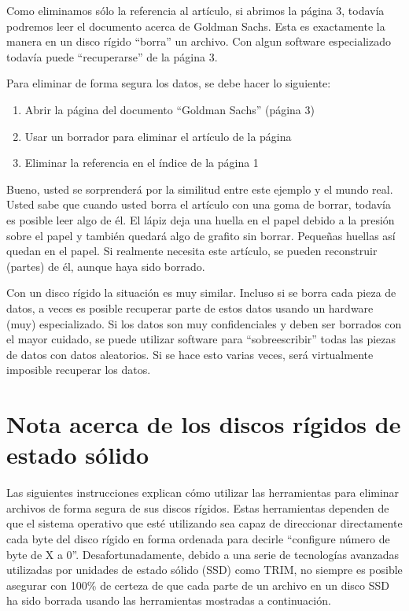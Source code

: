 \documentclass[10pt,a5paper,twoside,,]{book}
\providecommand{\tightlist}{%
  \setlength{\itemsep}{0pt}\setlength{\parskip}{0pt}}
\begin{document}
Como eliminamos sólo la referencia al artículo, si abrimos la página 3,
todavía podremos leer el documento acerca de Goldman Sachs. Esta es
exactamente la manera en un disco rígido ``borra'' un archivo. Con algun
software especializado todavía puede ``recuperarse'' de la página 3.

Para eliminar de forma segura los datos, se debe hacer lo siguiente:

\begin{enumerate}
\def\labelenumi{\arabic{enumi}.}
\tightlist
\item
  Abrir la página del documento ``Goldman Sachs'' (página 3)
\item
  Usar un borrador para eliminar el artículo de la página
\item
  Eliminar la referencia en el índice de la página 1
\end{enumerate}

Bueno, usted se sorprenderá por la similitud entre este ejemplo y el
mundo real. Usted sabe que cuando usted borra el artículo con una goma
de borrar, todavía es posible leer algo de él. El lápiz deja una huella
en el papel debido a la presión sobre el papel y también quedará algo de
grafito sin borrar. Pequeñas huellas así quedan en el papel. Si
realmente necesita este artículo, se pueden reconstruir (partes) de él,
aunque haya sido borrado.

Con un disco rígido la situación es muy similar. Incluso si se borra
cada pieza de datos, a veces es posible recuperar parte de estos datos
usando un hardware (muy) especializado. Si los datos son muy
confidenciales y deben ser borrados con el mayor cuidado, se puede
utilizar software para ``sobreescribir'' todas las piezas de datos con
datos aleatorios. Si se hace esto varias veces, será virtualmente
imposible recuperar los datos.

\section{Nota acerca de los discos rígidos de estado
sólido}\label{nota-acerca-de-los-discos-ruxedgidos-de-estado-suxf3lido}

Las siguientes instrucciones explican cómo utilizar las herramientas
para eliminar archivos de forma segura de sus discos rígidos. Estas
herramientas dependen de que el sistema operativo que esté utilizando
sea capaz de direccionar directamente cada byte del disco rígido en
forma ordenada para decirle ``configure número de byte de X a 0''.
Desafortunadamente, debido a una serie de tecnologías avanzadas
utilizadas por unidades de estado sólido (SSD) como TRIM, no siempre es
posible asegurar con 100\% de certeza de que cada parte de un archivo en
un disco SSD ha sido borrada usando las herramientas mostradas a
continuación.
\end{document}
